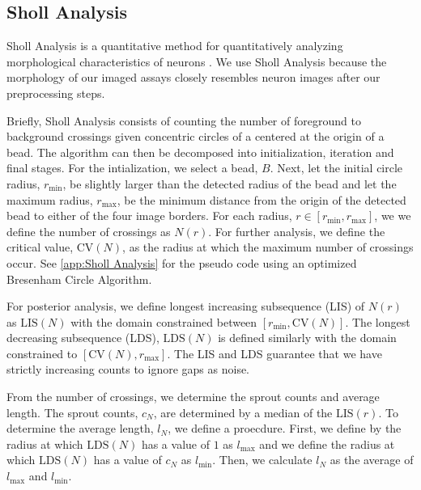 \documentclass{sig-alternate}
\begin{document}

	\subsection{Sholl Analysis} %
	\label{sub:Sholl Analysis}
		Sholl Analysis is a quantitative method for quantitatively
		analyzing morphological characteristics of neurons \cite{sholl53}.
		We use Sholl Analysis because the morphology of our imaged assays
		closely resembles neuron images after our preprocessing steps.

		Briefly, Sholl Analysis consists of counting the number of
		foreground to background crossings given concentric circles of a
		centered at the origin of a bead. The algorithm can then be
		decomposed into initialization, iteration and final stages. For
		the intialization, we select a bead, $B$. Next, let the initial
		circle radius, $r_{\min}$, be slightly larger than the detected
		radius of the bead and let the maximum radius, $r_{\max}$, be the
		minimum distance from the origin of the detected bead to either of
		the four image borders. For each radius, $r \in [r_{\min},
		r_{\max}]$, we we define the number of crossings as $N(r)$. For further analysis,
		we define the critical value, $\text{CV}(N)$, as the radius at which
		the maximum number of crossings occur. See \ref{app:Sholl
		Analysis} for the pseudo code using an optimized Bresenham Circle
		Algorithm.
		
		For posterior analysis, we define longest increasing subsequence
		(LIS) of $N(r)$ as $\text{LIS}(N)$ with the domain constrained
		between $[r_{\min}, \text{CV}(N)]$. The longest decreasing
		subsequence (LDS), $\text{LDS}(N)$ is defined similarly with the
		domain constrained to $[\text{CV}(N), r_{\max}]$. The LIS and LDS
		guarantee that we have strictly increasing counts to ignore gaps
		as noise.

		From the number of crossings, we determine the sprout counts and
		average length. The sprout counts, $c_N$, are determined by a
		median of the $\text{LIS}(r)$. To determine the average length,
		$l_N$, we define a proecdure. First, we define by the radius at
		which $\text{LDS}(N)$ has a value of $1$ as $l_{\max}$ and we
		define the radius at which $\text{LDS}(N)$ has a value of
		$c_N$ as $l_{\min}$. Then, we calculate $l_N$ as the average
		of $l_{\max}$ and $l_{\min}$.
\end{document}
